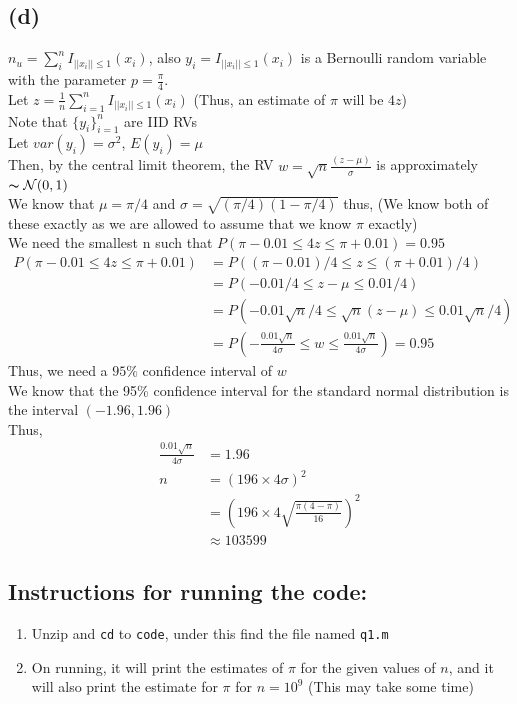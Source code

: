 \documentclass[11pt, fleqn]{article}
\begin{document}
\subsection*{(d)}
$n_u = \sum_{i}^n I_{||x_i||\le 1}(x_i)$, also $y_i = I_{||x_i||\le 1}(x_i)$ is a Bernoulli random variable with the parameter $p = \frac{\pi}{4}$.\\
Let $z = \frac{1}{n}\sum_{i=1}^{n}I_{||x_i||\le 1}(x_i)$ (Thus, an estimate of $\pi$ will be $4z$)\\
Note that $\{y_i\}_{i=1}^n$ are IID RVs\\
Let $var(y_i) = \sigma^2$, $E(y_i) = \mu$\\
Then, by the central limit theorem, the RV $w = \sqrt{n}\frac{(z - \mu)}{\sigma}$ is approximately $\thicksim \mathcal{N}(0, 1)$\\
We know that $\mu = \pi/4$ and $\sigma = \sqrt{(\pi/4)(1-\pi/4)}$ thus, (We know both of these exactly as we are allowed to assume that we know $\pi$ exactly)\\
We need the smallest n such that $P(\pi - 0.01 \le 4z \le \pi + 0.01) = 0.95$\\
$$
    \begin{aligned}
        P(\pi - 0.01 \le 4z \le \pi + 0.01) &= P((\pi - 0.01)/4 \le z \le (\pi + 0.01)/4)\\
        &= P(- 0.01/4 \le z-\mu \le  0.01/4)\\
        &= P(-0.01\sqrt{n}/4 \le \sqrt{n}(z-\mu) \le 0.01\sqrt{n}/4)\\
        &= P\left(-\frac{0.01\sqrt{n}}{4\sigma} \le w \le \frac{0.01\sqrt{n}}{4\sigma} \right) = 0.95
    \end{aligned}
$$
Thus, we need a $95\%$ confidence interval of $w$\\
We know that the 95\% confidence interval for the standard normal distribution is the interval $(-1.96, 1.96)$\\
Thus,
$$
    \begin{aligned}
        \frac{0.01\sqrt{n}}{4\sigma} &= 1.96\\
        n &= (196\times4\sigma)^2 \\ 
        &= \left(196\times4\sqrt{\frac{\pi(4-\pi)}{16}}\right)^2\\
        &\approx \boxed{103599}
    \end{aligned}
$$

\subsection*{Instructions for running the code:}
\begin{enumerate}[itemsep=-1ex]
    \item Unzip and \texttt{cd} to \texttt{code}, under this find the file named \texttt{q1.m}
    \item On running, it will print the estimates of $\pi$ for the given values of $n$, and it will also print the estimate for $\pi$ for $n = 10^9$ (This may take some time)
\end{enumerate}
\end{document}
